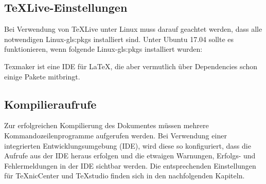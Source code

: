 \subsection{TeXLive-Einstellungen}
\label{sec:TeXLive}
Bei Verwendung von TeXLive unter Linux muss darauf geachtet werden, dass alle notwendigen Linux-\glspl{gls:pkg} installiert sind.
Unter Ubuntu 17.04 sollte es funktionieren, wenn folgende Linux-\glspl{gls:pkg} installiert wurden:
\begin{itemize*}
	\item {}
	\item {}
	\item {}
	\item {}
	\item {}
	\item {}
	\item {}
	\item {}
\end{itemize*}
Texmaker ist eine IDE für \LaTeX, die aber vermutlich über Dependencies schon einige Pakete mitbringt.


\subsection{Kompilieraufrufe}
\label{sec:Aufruf}
Zur erfolgreichen Kompilierung des Dokumentes müssen mehrere
Kommandozeilenprogramme aufgerufen werden.
Bei Verwendung einer integrierten Entwicklungsumgebung (IDE),
wird diese so konfiguriert, dass die Aufrufe aus der IDE heraus erfolgen und
die etwaigen Warnungen, Erfolgs- und Fehlermeldungen in der IDE sichtbar werden.
Die entsprechenden Einstellungen für TeXnicCenter und TeXstudio finden sich
in den nachfolgenden Kapiteln.

